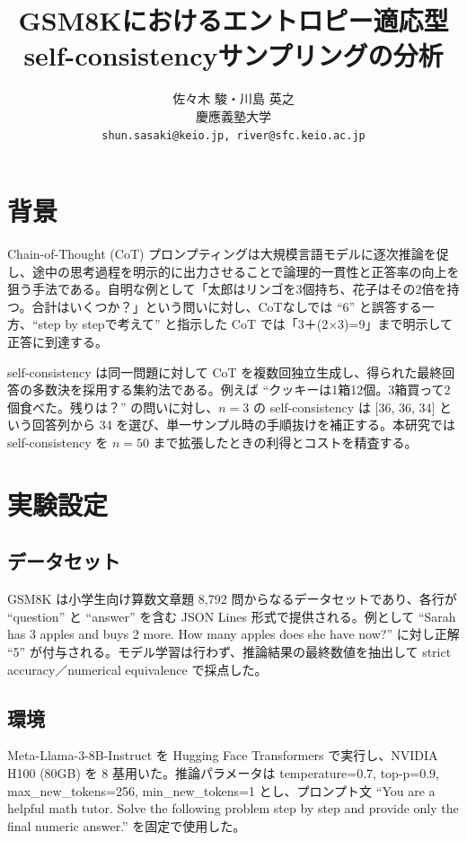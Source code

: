 \documentclass[twocolumn]{jsarticle}
\title{GSM8Kにおけるエントロピー適応型self-consistencyサンプリングの分析}
\author{佐々木 駿・川島 英之\\慶應義塾大学\\\texttt{shun.sasaki@keio.jp, river@sfc.keio.ac.jp}}
\begin{document}
\maketitle
\fontsize{9.8pt}{11.2pt}\selectfont

\section{背景}
Chain-of-Thought (CoT) プロンプティングは大規模言語モデルに逐次推論を促し、途中の思考過程を明示的に出力させることで論理的一貫性と正答率の向上を狙う手法である\cite{Wei2022Chain}。自明な例として「太郎はリンゴを3個持ち、花子はその2倍を持つ。合計はいくつか？」という問いに対し、CoTなしでは ``6'' と誤答する一方、``step by stepで考えて'' と指示した CoT では「3＋(2×3)=9」まで明示して正答に到達する。

self-consistency は同一問題に対して CoT を複数回独立生成し、得られた最終回答の多数決を採用する集約法である\cite{Wang2022SelfConsistencyIC}。例えば ``クッキーは1箱12個。3箱買って2個食べた。残りは？'' の問いに対し、$n=3$ の self-consistency は [36, 36, 34] という回答列から 34 を選び、単一サンプル時の手順抜けを補正する。本研究では self-consistency を $n=50$ まで拡張したときの利得とコストを精査する。

\section{実験設定}
\subsection{データセット}
GSM8K\cite{Cobbe2021TrainingVT} は小学生向け算数文章題 8,792 問からなるデータセットであり、各行が ``question'' と ``answer'' を含む JSON Lines 形式で提供される。例として ``Sarah has 3 apples and buys 2 more. How many apples does she have now?'' に対し正解 ``5'' が付与される。モデル学習は行わず、推論結果の最終数値を抽出して strict accuracy／numerical equivalence で採点した。

\subsection{環境}
Meta-Llama-3-8B-Instruct を Hugging Face Transformers で実行し、NVIDIA H100 (80GB) を 8 基用いた。推論パラメータは temperature=0.7, top-p=0.9, max\_new\_tokens=256, min\_new\_tokens=1 とし、プロンプト文 ``You are a helpful math tutor. Solve the following problem step by step and provide only the final numeric answer.'' を固定で使用した。
\end{document}
